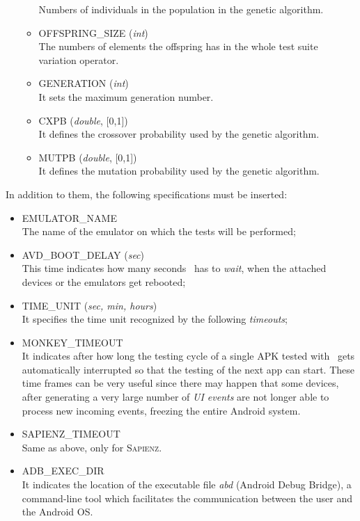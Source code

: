 \begin{itemize}
\begin{itemize}
Numbers of individuals in the population in the genetic algorithm. 
\item OFFSPRING\_SIZE (\textit{int})\\
The numbers of elements the offspring has in the whole test suite variation operator. 
\item GENERATION (\textit{int})\\
It sets the maximum generation number. 
\item CXPB (\textit{double}, [0,1])\\
It defines the crossover probability used by the genetic algorithm. 
\item MUTPB (\textit{double}, [0,1])\\
It defines the mutation probability used by the genetic algorithm. 
\end{itemize}
\end{itemize}

In addition to them, the following specifications must be inserted: 
\begin{itemize}
\item \textsc{EMULATOR\_NAME} \\
The name of the emulator on which the tests will be performed;
\item \textsc{AVD\_BOOT\_DELAY} (\textit{sec})\\
This time indicates how many seconds \toolname\ has to \textit{wait}, when the attached devices or the emulators get rebooted;
\item \textsc{TIME\_UNIT} (\textit{sec, min, hours})\\
It specifies the time unit recognized by the following \textit{timeouts}; 
\item \textsc{MONKEY\_TIMEOUT} \\
It indicates after how long the testing cycle of a single APK tested with \monkey\ gets automatically interrupted so that the testing of the next app can start. These time frames can be very useful since there may happen that some devices, after generating a very large number of \textit{UI events} are not longer able to process new incoming events, freezing the entire Android system. 
\item \textsc{SAPIENZ\_TIMEOUT} \\
Same as above, only for \textsc{Sapienz}.
\item \textsc{ADB\_EXEC\_DIR}\\
It indicates the location of the executable file \textit{abd} (Android Debug Bridge), a command-line tool which facilitates the communication between the user and the Android OS. 
\end{itemize}
\clearpage
